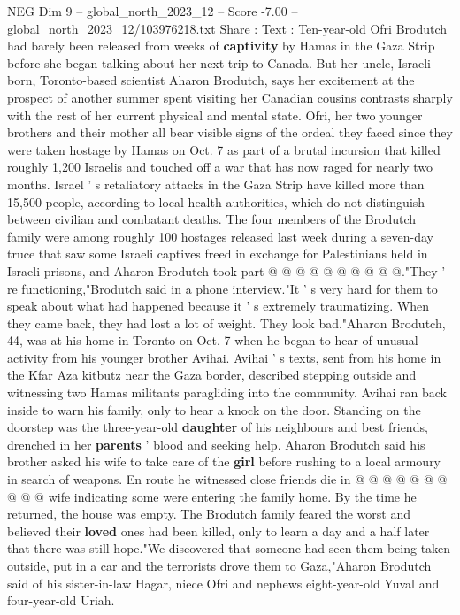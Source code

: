 \begin{textsample}{NEG Dim 9 – global\_north\_2023\_12 – Score -7.00 – global\_north\_2023\_12/103976218.txt}  \label{ex:f9_neg_080}
Share : Text : Ten-year-old Ofri Brodutch had barely been released from weeks of \textbf{captivity} by Hamas in the Gaza Strip before she began talking about her next trip to Canada.
But her uncle, Israeli-born, Toronto-based scientist Aharon Brodutch, says her excitement at the prospect of another summer spent visiting her Canadian cousins contrasts sharply with the rest of her current physical and mental state.
Ofri, her two younger brothers and their mother all bear visible signs of the ordeal they faced since they were taken hostage by Hamas on Oct. 7 as part of a brutal incursion that killed roughly 1,200 Israelis and touched off a war that has now raged for nearly two months.
Israel ' s retaliatory attacks in the Gaza Strip have killed more than 15,500 people, according to local health authorities, which do not distinguish between civilian and combatant deaths.
The four members of the Brodutch family were among roughly 100 hostages released last week during a seven-day truce that saw some Israeli captives freed in exchange for Palestinians held in Israeli prisons, and Aharon Brodutch took part @ @ @ @ @ @ @ @ @ @."They ' re functioning,"Brodutch said in a phone interview."It ' s very hard for them to speak about what had happened because it ' s extremely traumatizing.
When they came back, they had lost a lot of weight.
They look bad."Aharon Brodutch, 44, was at his home in Toronto on Oct. 7 when he began to hear of unusual activity from his younger brother Avihai.
Avihai ' s texts, sent from his home in the Kfar Aza kitbutz near the Gaza border, described stepping outside and witnessing two Hamas militants paragliding into the community.
Avihai ran back inside to warn his family, only to hear a knock on the door.
Standing on the doorstep was the three-year-old \textbf{daughter} of his neighbours and best friends, drenched in her \textbf{parents} ' blood and seeking help.
Aharon Brodutch said his brother asked his wife to take care of the \textbf{girl} before rushing to a local armoury in search of weapons.
En route he witnessed close friends die in @ @ @ @ @ @ @ @ @ @ wife indicating some were entering the family home.
By the time he returned, the house was empty.
The Brodutch family feared the worst and believed their \textbf{loved} ones had been killed, only to learn a day and a half later that there was still hope."We discovered that someone had seen them being taken outside, put in a car and the terrorists drove them to Gaza,"Aharon Brodutch said of his sister-in-law Hagar, niece Ofri and nephews eight-year-old Yuval and four-year-old Uriah.

\end{textsample}

